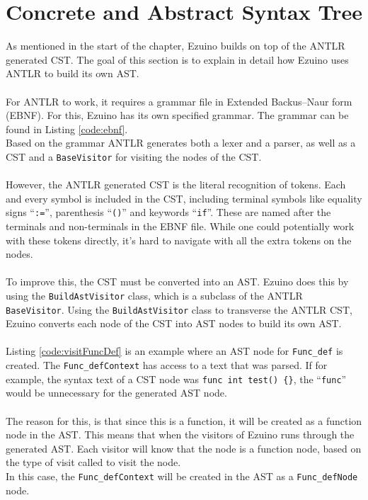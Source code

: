 \section{Concrete and Abstract Syntax Tree}
As mentioned in the start of the chapter, Ezuino builds on top of the ANTLR generated CST. The goal of this section is to explain in detail how Ezuino uses ANTLR to build its own AST.
\\\\
For ANTLR to work, it requires a grammar file in Extended Backus–Naur form (EBNF). For this, Ezuino has its own specified grammar. The grammar can be found in Listing \ref{code:ebnf}.\\
Based on the grammar ANTLR generates both a lexer and a parser, as well as a CST and a \texttt{BaseVisitor} for visiting the nodes of the CST.
\\\\
However, the ANTLR generated CST is the literal recognition of tokens. Each and every symbol is included in the CST, including terminal symbols like equality signs “\texttt{:=}”, parenthesis “\texttt{()}” and keywords “\texttt{if}”. These are named after the terminals and non-terminals in the EBNF file. While one could potentially work with these tokens directly, it’s hard to navigate with all the extra tokens on the nodes.
\\\\
To improve this, the CST must be converted into an AST. Ezuino does this by using the \texttt{BuildAstVisitor} class, which is a subclass of the ANTLR \texttt{BaseVisitor}. Using the \texttt{BuildAstVisitor} class to transverse the ANTLR CST, Ezuino converts each node of the CST into AST nodes to build its own AST.
\\\\
Listing \ref{code:visitFuncDef} is an example where an AST node for \texttt{Func\_def} is created. The \texttt{Func\_defContext} has access to a text that was parsed. If for example, the syntax text of a CST node was \texttt{func int test() \{\}}, the “\texttt{func}” would be unnecessary for the generated AST node.
\\\\
The reason for this, is that since this is a function, it will be created as a function node in the AST. This means that when the visitors of Ezuino runs through the generated AST. Each visitor will know that the node is a function node, based on the type of visit called to visit the node.\\
In this case, the \texttt{Func\_defContext} will be created in the AST as a \texttt{Func\_defNode} node.
